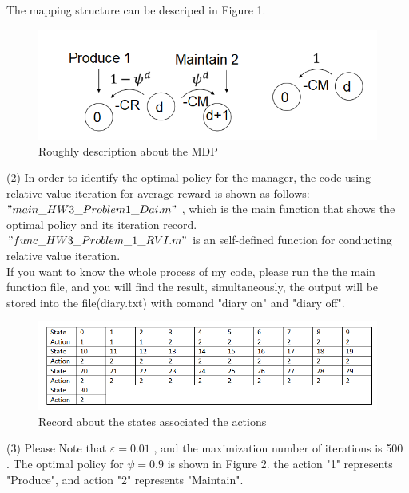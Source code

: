\documentclass[12pt]{article}%
\begin{document}
The mapping structure can be descriped in Figure 1.

\begin{figure}
\begin{center}
\includegraphics[width=0.8\linewidth]{map.jpg}
\end{center}
   \caption{Roughly description about the MDP}
\label{fig:short}
\end{figure}


(2) In order to identify the optimal policy for the manager, the code using relative value iteration for average reward is shown as follows:\\

$"main\_HW3\_Problem1\_Dai.m"$ , which  is the main function that shows the optimal policy and its iteration record.\\
$"func\_HW3\_Problem\_1\_RVI.m"$ is an self-defined function for conducting relative value iteration. \\

If you want to know the whole process of my code, please run the the main function file, and you will find the result, simultaneously, the output will be stored into the file(diary.txt) with comand "diary on" and "diary off".

\begin{figure}
\begin{center}
\includegraphics[width=0.8\linewidth]{record.jpg}
\end{center}
   \caption{Record about the states associated the actions}
\label{fig:short}
\end{figure}





(3) Please Note that $\varepsilon =0.01$ , and the maximization number of iterations is 500 . The  optimal policy for $\psi =0.9$ is shown in Figure 2.  the action "1" represents "Produce", and action "2" represents "Maintain".
\end{document}
